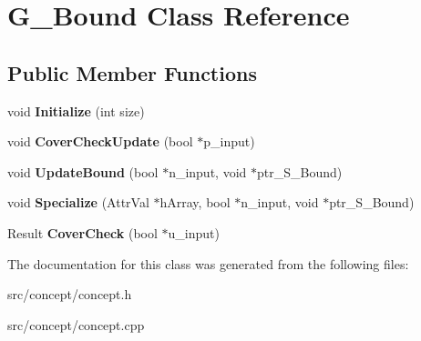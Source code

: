 \hypertarget{classG__Bound}{\section{G\-\_\-\-Bound Class Reference}
\label{classG__Bound}
}
\subsection*{Public Member Functions}
\begin{DoxyCompactItemize}
\item 
\hypertarget{classG__Bound_a30da552d80a6b169c76cc61410a05b78}{void {\bfseries Initialize} (int size)}\label{classG__Bound_a30da552d80a6b169c76cc61410a05b78}

\item 
\hypertarget{classG__Bound_a9344fe22bb13d39a425c5a5b690aace4}{void {\bfseries Cover\-Check\-Update} (bool $\ast$p\-\_\-input)}\label{classG__Bound_a9344fe22bb13d39a425c5a5b690aace4}

\item 
\hypertarget{classG__Bound_a8b473f262762ac5b74fdb766ded033aa}{void {\bfseries Update\-Bound} (bool $\ast$n\-\_\-input, void $\ast$ptr\-\_\-\-S\-\_\-\-Bound)}\label{classG__Bound_a8b473f262762ac5b74fdb766ded033aa}

\item 
\hypertarget{classG__Bound_a28f2ef635a7a74db831df0f2da088181}{void {\bfseries Specialize} (Attr\-Val $\ast$h\-Array, bool $\ast$n\-\_\-input, void $\ast$ptr\-\_\-\-S\-\_\-\-Bound)}\label{classG__Bound_a28f2ef635a7a74db831df0f2da088181}

\item 
\hypertarget{classG__Bound_aea45d16a15dfd2c30985d89f92803b22}{Result {\bfseries Cover\-Check} (bool $\ast$u\-\_\-input)}\label{classG__Bound_aea45d16a15dfd2c30985d89f92803b22}

\end{DoxyCompactItemize}


The documentation for this class was generated from the following files\-:\begin{DoxyCompactItemize}
\item 
src/concept/concept.\-h\item 
src/concept/concept.\-cpp\end{DoxyCompactItemize}
